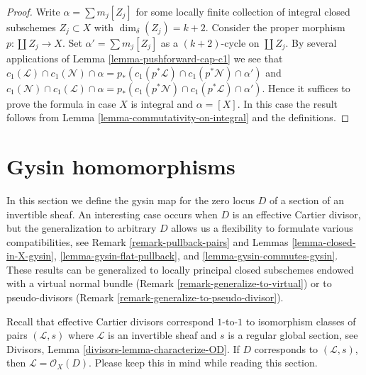 \begin{proof}
Write $\alpha = \sum m_j[Z_j]$ for some locally finite
collection of integral closed subschemes $Z_j \subset X$
with $\dim_\delta(Z_j) = k + 2$.
Consider the proper morphism $p : \coprod Z_j \to X$.
Set $\alpha' = \sum m_j[Z_j]$ as a $(k + 2)$-cycle on
$\coprod Z_j$. By several applications of
Lemma \ref{lemma-pushforward-cap-c1} we see that
$c_1(\mathcal{L}) \cap c_1(\mathcal{N}) \cap \alpha
= p_*(c_1(p^*\mathcal{L}) \cap c_1(p^*\mathcal{N}) \cap \alpha')$
and
$c_1(\mathcal{N}) \cap c_1(\mathcal{L}) \cap \alpha
= p_*(c_1(p^*\mathcal{N}) \cap c_1(p^*\mathcal{L}) \cap \alpha')$.
Hence it suffices to prove the formula in case $X$ is integral
and $\alpha = [X]$. In this case the result follows
from Lemma \ref{lemma-commutativity-on-integral} and the definitions.
\end{proof}






\section{Gysin homomorphisms}
\label{section-intersecting-effective-Cartier}

\noindent
In this section we define the gysin map for the zero locus $D$ of a
section of an invertible sheaf. An interesting case occurs when $D$
is an effective Cartier divisor, but the generalization to arbitrary $D$
allows us a flexibility to formulate various compatibilities, see
Remark \ref{remark-pullback-pairs} and
Lemmas \ref{lemma-closed-in-X-gysin}, \ref{lemma-gysin-flat-pullback}, and
\ref{lemma-gysin-commutes-gysin}.
These results can be generalized to locally principal closed subschemes
endowed with a virtual normal bundle
(Remark \ref{remark-generalize-to-virtual}) or to
pseudo-divisors (Remark \ref{remark-generalize-to-pseudo-divisor}).

\medskip\noindent
Recall that effective Cartier divisors correspond $1$-to-$1$ to
isomorphism classes of pairs $(\mathcal{L}, s)$ where $\mathcal{L}$
is an invertible sheaf and $s$ is a regular global section, see
Divisors, Lemma \ref{divisors-lemma-characterize-OD}.
If $D$ corresponds to $(\mathcal{L}, s)$, then
$\mathcal{L} = \mathcal{O}_X(D)$. Please keep this in mind while
reading this section.

